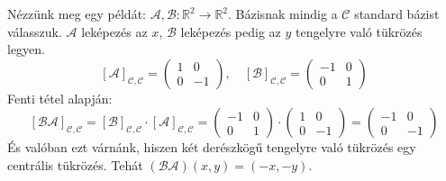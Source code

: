 \documentclass[a4paper,12pt,twoside]{book}
\newcommand{\R}{\mathbb{R}}
\theoremstyle{break}
\begin{document}


Nézzünk meg egy példát: $\mathcal{A},\mathcal{B}: \R^2 \to \R^2$. Bázisnak mindig a $\mathcal{C}$ standard bázist válasszuk. $\mathcal{A}$ leképezés az $x$, $\mathcal{B}$ leképezés pedig az $y$ tengelyre való tükrözés legyen.
\[[\mathcal{A}]_{\mathcal{C},\mathcal{C}} = \begin{pmatrix}1 & 0 \\ 0 & -1\end{pmatrix}, \quad [\mathcal{B}]_{\mathcal{C},\mathcal{C}} = \begin{pmatrix}-1 & 0 \\ 0 & 1\end{pmatrix}\]
Fenti tétel alapján: 
\[[\mathcal{BA}]_{\mathcal{C},\mathcal{C}} = [\mathcal{B}]_{\mathcal{C},\mathcal{C}}\cdot [\mathcal{A}]_{\mathcal{C},\mathcal{C}} = \begin{pmatrix}-1 & 0 \\ 0 & 1\end{pmatrix}\cdot \begin{pmatrix}1 & 0 \\ 0 & -1\end{pmatrix} = \begin{pmatrix}-1 & 0\\ 0 & -1\end{pmatrix}\]
És valóban ezt várnánk, hiszen két derészkögű tengelyre való tükrözés egy centrális tükrözés. Tehát $(\mathcal{BA})(x,y) = (-x, -y)$.
\end{document}

